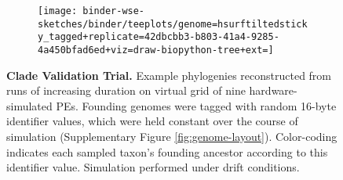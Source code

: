 \begin{figure}
\begin{subfigure}[c]{\linewidth} \centering
  \begin{minipage}[c]{0.08\linewidth} \flushright
    \caption{}
    \label{fig:tagged_250}
  \end{minipage}%
  \begin{minipage}[c]{0.92\linewidth}
    \texttt{[image: binder-wse-sketches/binder/teeplots/genome=hsurftiltedsticky\_tagged+replicate=42dbcbb3-b803-41a4-9285-4a450bfad6ed+viz=draw-biopython-tree+ext=]}
  \end{minipage}%
\end{subfigure}

\vspace{-1.5ex}

\caption{%
\textbf{Clade Validation Trial.}
\footnotesize
Example phylogenies reconstructed from runs of increasing duration on virtual grid of nine hardware-simulated PEs.
Founding genomes were tagged with random 16-byte identifier values, which were held constant over the course of simulation (Supplementary Figure \ref{fig:genome-layout}).
Color-coding indicates each sampled taxon's founding ancestor according to this identifier value.
Simulation performed under drift conditions.
}
\label{fig:tagged}
\vspace{-0.2in}
\end{figure}
